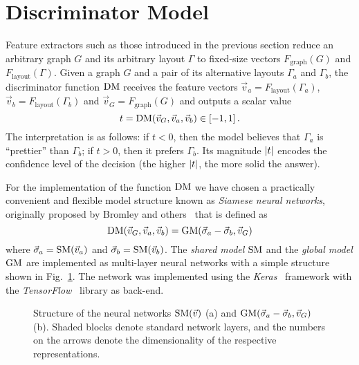 
%

\section{Discriminator Model}
\label{sec:model}

Feature extractors such as those introduced in the previous section reduce an arbitrary graph $G$ and its arbitrary
layout $\Gamma$ to fixed-size vectors $F_\mathrm{graph}(G)$ and $F_\mathrm{layout}(\Gamma)$.  Given a graph $G$ and a
pair of its alternative layouts $\Gamma_a$ and $\Gamma_b$, the discriminator function $\operatorname{DM}$ receives the feature vectors
$\vec{v}_a=F_\mathrm{layout}(\Gamma_a)$, $\vec{v}_b=F_\mathrm{layout}(\Gamma_b)$ and $\vec{v}_G=F_\mathrm{graph}(G)$ and
outputs a scalar value
\begin{equation}
  t = \operatorname{DM}(\vec{v}_G,\vec{v}_a,\vec{v}_b) \in [-1, 1]
  \,.
\end{equation}
The interpretation is as follows: if $t<0$, then the model believes that $\Gamma_a$ is \enquote{prettier} than
$\Gamma_b$; if $t>0$, then it prefers $\Gamma_b$.  Its magnitude $\left\lvert t\right\rvert$ encodes the confidence level of the decision
(the higher $\left\lvert t\right\rvert$, the more solid the answer).

For the implementation of the function $\operatorname{DM}$ we have chosen a practically convenient and flexible model structure known
as \emph{Siamese neural networks}, originally proposed by Bromley and others~\cite{Bromley1994} that is defined as
\begin{equation}
 \operatorname{DM}(\vec{v}_G,\vec{v}_a,\vec{v}_b) = \operatorname{GM}(\vec{\sigma}_a-\vec{\sigma}_b,\vec{v}_G)
\end{equation}
where $\vec{\sigma}_a=\operatorname{SM}(\vec{v}_a)$ and $\vec{\sigma}_b=\operatorname{SM}(\vec{v}_b)$.  The \emph{shared model} $\operatorname{SM}$ and the
\emph{global model} $\operatorname{GM}$ are implemented as multi-layer neural networks with a simple structure shown in
Fig.~\ref{fig:nn-structure}.  The network was implemented using the \emph{Keras}~\cite{Keras} framework with the
\emph{TensorFlow}~\cite{TensorFlow} library as back-end.

\begin{figure}
  \begin{center}
    
  \end{center}
  \caption{
    Structure of the neural networks $\operatorname{SM}(\vec{v})$ (a) and $\operatorname{GM}(\vec{\sigma}_a-\vec{\sigma}_b,\vec{v}_G)$ (b).  Shaded
    blocks denote standard network layers, and the numbers on the arrows denote the dimensionality of the respective
    representations.
  }
  \label{fig:nn-structure}
\end{figure}

